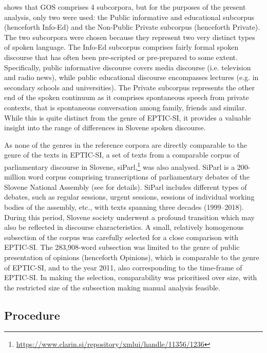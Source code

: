 \documentclass[output=paper]{langscibook}
\begin{document}
 shows that GOS comprises 4 subcorpora, but for the purposes of the present analysis, only two were used: the Public informative and educational subcorpus (henceforth Info-Ed) and the Non-Public Private subcorpus (henceforth Private). The two subcorpora were chosen because they represent two very distinct types of spoken language. The Info-Ed subcorpus comprises fairly formal spoken discourse that has often been pre-scripted or pre-prepared to some extent. Specifically, public informative discourse covers media discourse (i.e. television and radio news), while public educational discourse encompasses lectures (e.g. in secondary schools and universities). The Private subcorpus represents the other end of the spoken continuum as it comprises spontaneous speech from private contexts, that is spontaneous conversation among family, friends and similar. While this is quite distinct from the genre of EPTIC-SI, it provides a valuable insight into the range of differences in Slovene spoken discourse.

As none of the genres in the reference corpora are directly comparable to the genre of the texts in EPTIC-SI, a set of texts from a comparable corpus of parliamentary discourse in Slovene, siParl,\footnote{\url{https://www.clarin.si/repository/xmlui/handle/11356/1236}} was also analysed. SiParl is a 200-million word corpus comprising transcriptions of parliamentary debates of the Slovene National Assembly (see \citealt{PancurErjavec2020} for details). SiParl includes different types of debates, such as regular sessions, urgent sessions, sessions of individual working bodies of the assembly, etc., with texts spanning three decades (1999--2018). During this period, Slovene society underwent a profound transition which may also be reflected in discourse characteristics. A small, relatively homogenous subsection of the corpus was carefully selected for a close comparison with EPTIC-SI. The 283,908-word subsection was limited to the genre of public presentation of opinions (henceforth Opinions), which is comparable to the genre of EPTIC-SI, and to the year 2011, also corresponding to the time-frame of EPTIC-SI. In making the selection, comparability was prioritised over size, with the restricted size of the subsection making manual analysis feasible.

\subsection{
Procedure
}\label{sec:mikolic:4.2}
\end{document}
